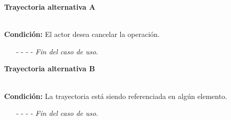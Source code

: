 \hypertarget{CU12-1-1-3:TAA}{\textbf{Trayectoria alternativa A}}\\
\noindent \textbf{Condición:} El actor desea cancelar la operación.
\begin{enumerate}
	\UCpaso[\UCactor] Oprime el botón  de la pantalla emergente.
	\UCpaso[\UCsist] Muestra la pantalla .
	\item[- -] - - {\em {Fin del caso de uso}}.%
\end{enumerate}
	\hypertarget{CU12-1-1-3:TAB}{\textbf{Trayectoria alternativa B}}\\
	\noindent \textbf{Condición:} La trayectoria está siendo referenciada en algún elemento.
	\begin{enumerate}
		\UCpaso[\UCsist] Muestra el mensaje  en la pantalla  en una pantalla emergente con la lista de elementos que están referenciando a la trayectoria.
		\UCpaso[\UCactor] Oprime el botón  de la pantalla emergente.
		\UCpaso[\UCsist] Muestra la pantalla .
		\item[- -] - - {\em {Fin del caso de uso}}.
	\end{enumerate}

